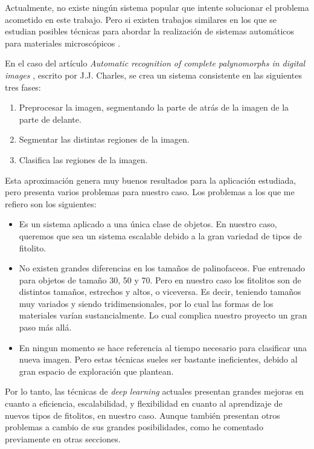 

Actualmente, no existe ningún sistema popular que intente solucionar el problema acometido en este trabajo. Pero si existen trabajos similares en los que se estudian posibles técnicas para abordar la realización de sistemas automáticos para materiales microscópicos \cite{palyrecog}.

En el caso del artículo \textit{Automatic recognition of complete palynomorphs in digital images} \cite{palyrecog}, escrito por J.J. Charles, se crea un sistema consistente en las siguientes tres fases:

\begin{enumerate}
	\item Preprocesar la imagen, segmentando la parte de atrás de la imagen de la parte de delante.
	\item Segmentar las distintas regiones de la imagen.
	\item Clasifica las regiones de la imagen.
\end{enumerate}

Esta aproximación genera muy buenos resultados para la aplicación estudiada, pero presenta varios problemas para nuestro caso. Los problemas a los que me refiero son los siguientes:

\begin{itemize}
	\item Es un sistema aplicado a una única clase de objetos. En nuestro caso, queremos que sea un sistema escalable debido a la gran variedad de tipos de fitolito.
	\item No existen grandes diferencias en los tamaños de palinofaceos. Fue entrenado para objetos de tamaño 30, 50 y 70. Pero en nuestro caso los fitolitos son de distintos tamaños, estrechos y altos, o viceversa. Es decir, teniendo tamaños muy variados y siendo tridimensionales, por lo cual las formas de los materiales varían sustancialmente. Lo cual complica nuestro proyecto un gran paso más allá.
	\item En ningun momento se hace referencia al tiempo necesario para clasificar una nueva imagen. Pero estas técnicas sueles ser bastante ineficientes, debido al gran espacio de exploración que plantean.
\end{itemize}

Por lo tanto, las técnicas de \textit{deep learning} actuales presentan grandes mejoras en cuanto a eficiencia, escalabilidad, y flexibilidad en cuanto al aprendizaje de nuevos tipos de fitolitos, en nuestro caso. Aunque también presentan otros problemas a cambio de sus grandes posibilidades, como he comentado previamente en otras secciones.